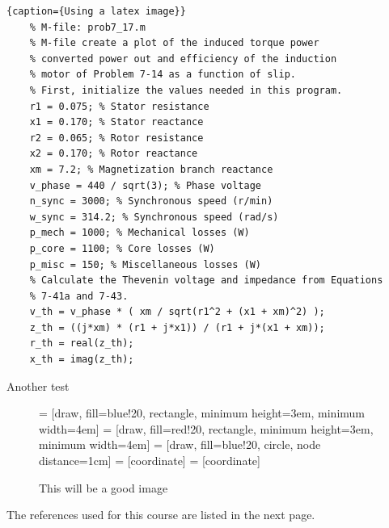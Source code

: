 \documentclass{report}
\newcommand{\re}{\mathrm{ref}}
\theoremstyle{plain}
\theoremstyle{definition}
\theoremstyle{remark}
\begin{document}
\begin{lstlisting}{caption={Using a latex image}}
	% M-file: prob7_17.m
	% M-file create a plot of the induced torque power
	% converted power out and efficiency of the induction
	% motor of Problem 7-14 as a function of slip.
	% First, initialize the values needed in this program.
	r1 = 0.075; % Stator resistance
	x1 = 0.170; % Stator reactance
	r2 = 0.065; % Rotor resistance
	x2 = 0.170; % Rotor reactance
	xm = 7.2; % Magnetization branch reactance
	v_phase = 440 / sqrt(3); % Phase voltage
	n_sync = 3000; % Synchronous speed (r/min)
	w_sync = 314.2; % Synchronous speed (rad/s)
	p_mech = 1000; % Mechanical losses (W)
	p_core = 1100; % Core losses (W)
	p_misc = 150; % Miscellaneous losses (W)
	% Calculate the Thevenin voltage and impedance from Equations
	% 7-41a and 7-43.
	v_th = v_phase * ( xm / sqrt(r1^2 + (x1 + xm)^2) );
	z_th = ((j*xm) * (r1 + j*x1)) / (r1 + j*(x1 + xm));
	r_th = real(z_th);
	x_th = imag(z_th);
\end{lstlisting}


Another test 
\begin{figure}
\centering
\begin{lateximage}
 = [draw, fill=blue!20, rectangle, minimum height=3em, minimum width=4em]
 = [draw, fill=red!20, rectangle, minimum height=3em, minimum width=4em]
 = [draw, fill=blue!20, circle, node distance=1cm]
 = [coordinate]
 = [coordinate]
\end{lateximage}
\caption{This will be a good image}
\end{figure}
\nocite{*}

The references used for this course are listed in the next page.  \\
\end{document}
